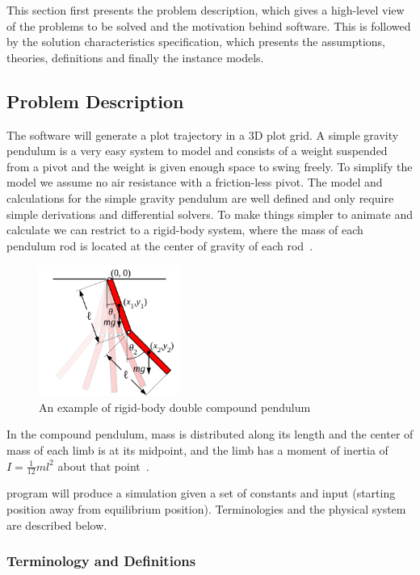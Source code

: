 \documentclass[12pt]{article}
\begin{document}
This section first presents the problem description, which gives a high-level
view of the problems to be solved and the motivation behind \progname software.
This is followed by the solution
characteristics specification, which presents the assumptions, theories, 
definitions and finally the instance models.

\subsection{Problem Description}

The \progname software will generate a plot trajectory in a 3D plot grid.
A simple gravity pendulum is a very easy system to model and consists of a
weight suspended from a pivot and the weight is given enough space to swing
freely. To simplify the model we assume no air resistance with a friction-less
pivot. The model and calculations for the simple gravity pendulum are well
defined and only require simple derivations and differential solvers. 
To make things simpler to animate and calculate we can restrict to a rigid-body 
system, where the mass 
of each pendulum rod is located at the center of gravity of each 
rod~\cite{DoublePendulum}.

\begin{figure}[!htb]
	\centering
	\includegraphics[width=175px]{Double-pendulum-rigid.png}
	\caption{An example of rigid-body double compound 
	pendulum~\citep{DoublePendulum}}
	\label{fig:multipend}
\end{figure}

In the compound pendulum, mass is distributed along its length and the center 
of mass of each limb is at its midpoint, and the limb has a moment of inertia 
of $I = \frac{1}{12}ml^2$ about that point~\cite{DoublePendulum}.

\progname program will produce a simulation given a set of constants and input 
(starting position away from equilibrium position).
Terminologies and the physical system are described below.

\subsubsection{Terminology and Definitions}
\end{document}
